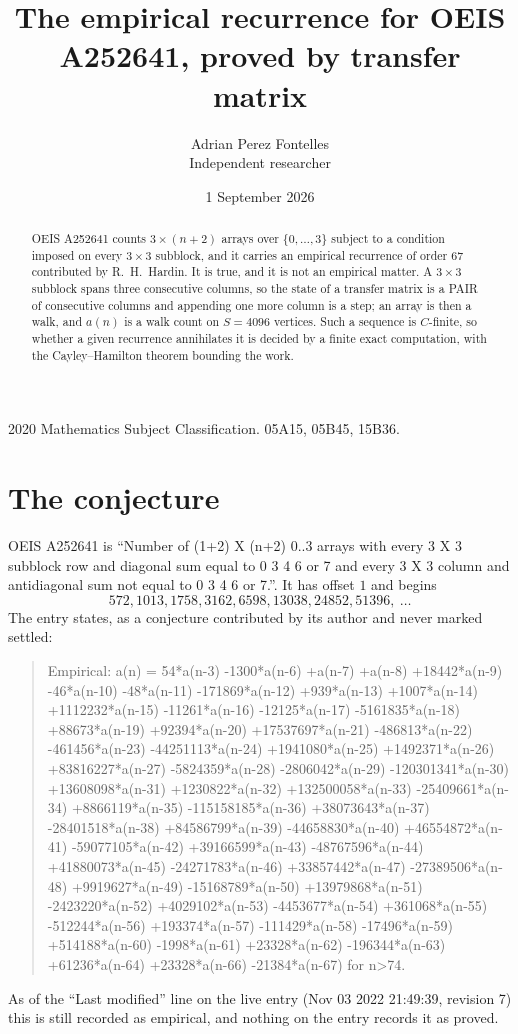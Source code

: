 \documentclass[11pt,a4paper]{article}
\title{The empirical recurrence for OEIS A252641, proved by transfer matrix}
\author{Adrian Perez Fontelles\\ \small Independent researcher}
\date{1 September 2026}
\theoremstyle{plain}
\theoremstyle{definition}
\begin{document}
\maketitle

\begin{abstract}
OEIS A252641 counts $3\times(n+2)$ arrays over $\{0,\dots,3\}$ subject to a condition imposed on
every $3\times3$ subblock, and it carries an empirical recurrence of order $67$
contributed by R.~H.~Hardin. It is true, and it is not an empirical matter. A $3\times3$
subblock spans three consecutive columns, so the state of a transfer matrix is a PAIR of
consecutive columns and appending one more column is a step; an array is then a walk, and
$a(n)$ is a walk count on $S=4096$ vertices. Such a sequence is $C$-finite, so whether a given
recurrence annihilates it is decided by a finite exact computation, with the Cayley--Hamilton
theorem bounding the work.
\end{abstract}

\noindent\small 2020 Mathematics Subject Classification. 05A15, 05B45, 15B36.\normalsize

\section{The conjecture}

OEIS A252641 is ``Number of (1+2) X (n+2) 0..3 arrays with every 3 X 3 subblock row and diagonal sum equal to 0 3 4 6 or 7 and every 3 X 3 column and antidiagonal sum not equal to 0 3 4 6 or 7.''. It has offset $1$ and begins
\[
572, 1013, 1758, 3162, 6598, 13038, 24852, 51396,\ \dots
\]
The entry states, as a conjecture contributed by its author and never marked settled:
\begin{quote}
Empirical: a(n) = 54*a(n-3) -1300*a(n-6) +a(n-7) +a(n-8) +18442*a(n-9) -46*a(n-10) -48*a(n-11) -171869*a(n-12) +939*a(n-13) +1007*a(n-14) +1112232*a(n-15) -11261*a(n-16) -12125*a(n-17) -5161835*a(n-18) +88673*a(n-19) +92394*a(n-20) +17537697*a(n-21) -486813*a(n-22) -461456*a(n-23) -44251113*a(n-24) +1941080*a(n-25) +1492371*a(n-26) +83816227*a(n-27) -5824359*a(n-28) -2806042*a(n-29) -120301341*a(n-30) +13608098*a(n-31) +1230822*a(n-32) +132500058*a(n-33) -25409661*a(n-34) +8866119*a(n-35) -115158185*a(n-36) +38073643*a(n-37) -28401518*a(n-38) +84586799*a(n-39) -44658830*a(n-40) +46554872*a(n-41) -59077105*a(n-42) +39166599*a(n-43) -48767596*a(n-44) +41880073*a(n-45) -24271783*a(n-46) +33857442*a(n-47) -27389506*a(n-48) +9919627*a(n-49) -15168789*a(n-50) +13979868*a(n-51) -2423220*a(n-52) +4029102*a(n-53) -4453677*a(n-54) +361068*a(n-55) -512244*a(n-56) +193374*a(n-57) -111429*a(n-58) -17496*a(n-59) +514188*a(n-60) -1998*a(n-61) +23328*a(n-62) -196344*a(n-63) +61236*a(n-64) +23328*a(n-66) -21384*a(n-67) for n>74.
\end{quote}
As of the ``Last modified'' line on the live entry (Nov 03 2022 21:49:39, revision 7) this is still
recorded as empirical, and nothing on the entry records it as proved.
\end{document}
